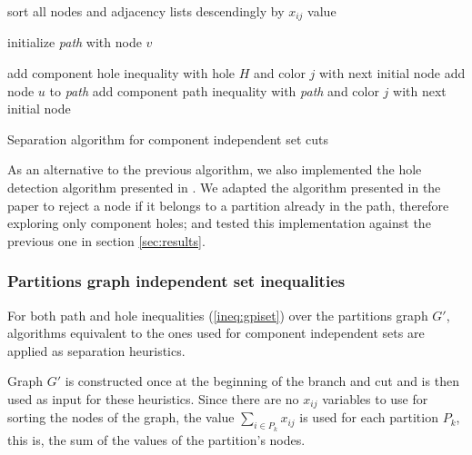 \begin{algorithm}
\label{alg:sep:ciset}

\begin{algorithmic}

\STATE sort all nodes and adjacency lists descendingly by $x_{ij}$ value
 
	\STATE initialize \textit{path} with node $v$

	\LOOP
					\STATE add component hole inequality with hole $H$ and color $j$
					\CONTINUE with next initial node
				\ENDIF
			\ELSE
				\STATE add node $u$ to \textit{path}	
					\STATE add component path inequality with \textit{path} and color $j$
					\CONTINUE with next initial node
				\ENDIF
			\ENDIF
		\ENDFOR
	\ENDLOOP
\ENDFOR

\ENDFOR

\caption{Separation algorithm for component independent set cuts}

\end{algorithmic}
\end{algorithm}

As an alternative to the previous algorithm, we also implemented the hole detection algorithm presented in \cite{nikolopoulos2004hole}. We adapted the algorithm presented in the paper to reject a node if it belongs to a partition already in the path, therefore exploring only component holes; and tested this implementation against the previous one in section \ref{sec:results}.

\subsubsection*{Partitions graph independent set inequalities}

For both path and hole inequalities (\ref{ineq:gpiset}) over the partitions graph $G'$, algorithms equivalent to the ones used for component independent sets are applied as separation heuristics.

Graph $G'$ is constructed once at the beginning of the branch and cut and is then used as input for these heuristics. Since there are no $x_{ij}$ variables to use for sorting the nodes of the graph, the value $\sum_{i \in P_k} x_{ij}$ is used for each partition $P_k$, this is, the sum of the values of the partition's nodes.

